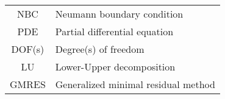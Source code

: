 \begin{longtable}{c p{10cm}}
    NBC                   & Neumann boundary condition                                \\
    PDE                   & Partial differential equation                             \\
    DOF(s)                & Degree(s) of freedom                                      \\
    LU                    & Lower-Upper decomposition                                 \\
    GMRES                 & Generalized minimal residual method                       \\
\end{longtable}

\pagestyle{fancy}